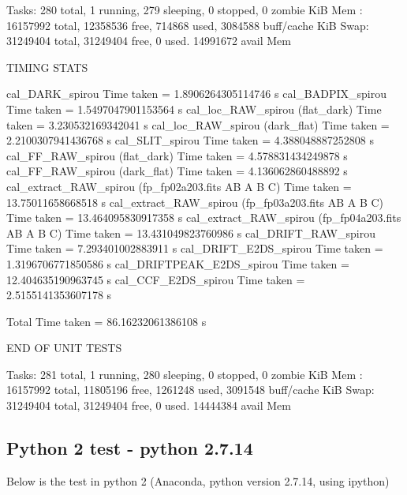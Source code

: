 \begin{cmdboxprint}
Tasks: 280 total,   1 running, 279 sleeping,   0 stopped,   0 zombie
KiB Mem : 16157992 total, 12358536 free,   714868 used,  3084588 buff/cache
KiB Swap: 31249404 total, 31249404 free,        0 used. 14991672 avail Mem

TIMING STATS

cal_DARK_spirou Time taken = 1.8906264305114746 s
cal_BADPIX_spirou Time taken = 1.5497047901153564 s
cal_loc_RAW_spirou (flat_dark) Time taken = 3.230532169342041 s
cal_loc_RAW_spirou (dark_flat) Time taken = 2.2100307941436768 s
cal_SLIT_spirou Time taken = 4.388048887252808 s
cal_FF_RAW_spirou (flat_dark) Time taken = 4.578831434249878 s
cal_FF_RAW_spirou (dark_flat) Time taken = 4.136062860488892 s
cal_extract_RAW_spirou (fp_fp02a203.fits AB A B C) Time taken = 13.75011658668518 s
cal_extract_RAW_spirou (fp_fp03a203.fits AB A B C) Time taken = 13.464095830917358 s
cal_extract_RAW_spirou (fp_fp04a203.fits AB A B C) Time taken = 13.431049823760986 s
cal_DRIFT_RAW_spirou Time taken = 7.293401002883911 s
cal_DRIFT_E2DS_spirou Time taken = 1.3196706771850586 s
cal_DRIFTPEAK_E2DS_spirou Time taken = 12.404635190963745 s
cal_CCF_E2DS_spirou Time taken = 2.5155141353607178 s

Total Time taken = 86.16232061386108 s

END OF UNIT TESTS

Tasks: 281 total,   1 running, 280 sleeping,   0 stopped,   0 zombie
KiB Mem : 16157992 total, 11805196 free,  1261248 used,  3091548 buff/cache
KiB Swap: 31249404 total, 31249404 free,        0 used. 14444384 avail Mem
\end{cmdboxprint}


\clearpage
\newpage
\subsection{Python 2 test - python 2.7.14}

Below is the test in python 2 (Anaconda, python version 2.7.14, using ipython)

